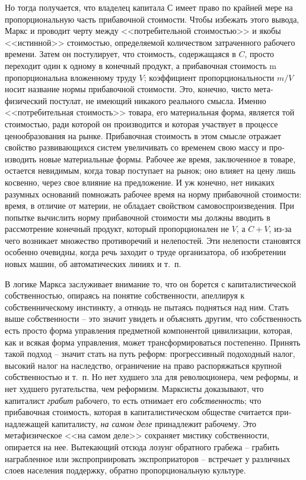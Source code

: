 \documentclass{book}
\begin{document}
Но тогда получается, что владелец капитала С имеет право по крайней мере на пропорциональную часть прибавочной стои­мости. Чтобы избежать этого вывода, Маркс и проводит черту между <<потребительной стоимостью>> и якобы <<истинной>> стоимостью, определяемой количеством затраченного рабочего времени. Затем он постулирует, что стоимость, содержащаяся в $C$, просто переходит один к одному в конечный продукт, а прибавочная стоимость m  пропорциональна вложенному труду $V$; коэффициент пропорциональности $m/V$ носит назва­ние нормы прибавочной стоимости. Это, конечно, чисто мета­физический постулат, не имеющий никакого реального смысла. Именно <<потребительная стоимость>> товара, его материальная форма, является той стоимостью, ради которой он производит­ся и которая участвует в процессе ценообразования на рынке. Прибавочная стоимость в этом смысле отражает свойство раз­вивающихся систем увеличивать со временем свою массу и про­изводить новые материальные формы. Рабочее же время, заклю­ченное в товаре, остается 
невидимым, когда товар поступает на рынок; оно влияет на цену лишь косвенно, через свое влия­ние на предложение. И уж конечно, нет никаких разумных ос­нований помножать рабочее время на норму прибавочной сто­имости: время, в отличие от материи, не обладает свойством самовоспроизведения. При попытке вычислить норму приба­вочной стоимости мы должны вводить в рассмотрение конечный продукт, который пропорционален не $V$, а $C + V$, из-за чего возникает множество противоречий и нелепостей. Эти не­лепости становятся особенно очевидны, когда речь заходит о труде организатора, об изобретении новых машин, об автоматических линиях и т.~п.

В логике Маркса заслуживает внимание то, что он борется с капиталистической собственностью, опираясь на понятие соб­ственности, апеллируя к собственническому инстинкту, а отнюдь не пытаясь подняться над ним. Стать выше собственности -- это значит увидеть и объяснять другим, что собственность есть просто форма управления предметной компонентой цивилиза­ции, которая, как и всякая форма управления, может транс­формироваться постепенно. Принять такой подход -- значит стать на путь реформ: прогрессивный подоходный налог, высо­кий налог на наследство, ограничение на право распоряжаться крупной собственностью и т.~п. Но нет худшего зла для рево­люционера, чем реформы, и нет худшего ругательства, чем ре­формизм. Марксисты доказывают, что капиталист \textit{грабит}  рабо­чего, то есть отнимает его \textit{собственность};  что прибавочная сто­имость, которая в капиталистическом обществе считается при­надлежащей капиталисту, \textit{на самом деле}  принадлежит рабочему. Это метафизическое <<на самом деле>> сохраняет мистику собст­венности, 
опирается на нее. Вытекающий отсюда лозунг обрат­ного грабежа -- грабить награбленное или экспроприировать экспроприаторов -- встречает у различных слоев населения поддержку, обратно пропорциональную культуре.
\end{document}
